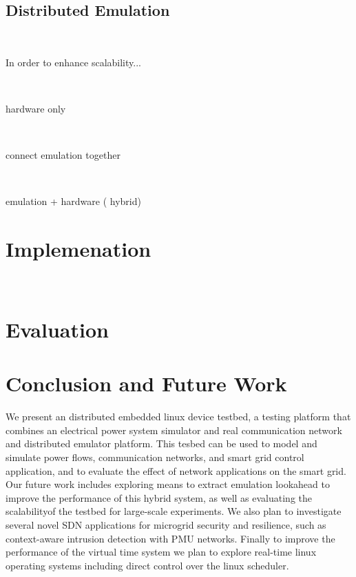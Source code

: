 \subsection{Distributed Emulation}
\

In order to enhance scalability...

\

hardware only

\

connect emulation together

\

emulation + hardware ( hybrid)


\section{Implemenation}

\

\section{Evaluation}

\section{Conclusion and Future Work}
We present an distributed embedded linux device testbed, a testing platform that combines an
electrical power system simulator and real communication network and distributed emulator platform. This tesbed can be used to model and simulate power flows, communication networks, and smart grid control application, and to evaluate the effect of network applications on the smart grid. Our future work includes
exploring means to extract emulation lookahead to improve
the performance of this hybrid system, as well as evaluating the scalabilityof the testbed for large-scale experiments. We also plan to investigate several novel SDN
applications for microgrid security and resilience, such as context-aware intrusion detection with PMU networks. Finally to improve the performance of the virtual time system we plan to explore real-time linux operating systems including direct control over the linux scheduler.
